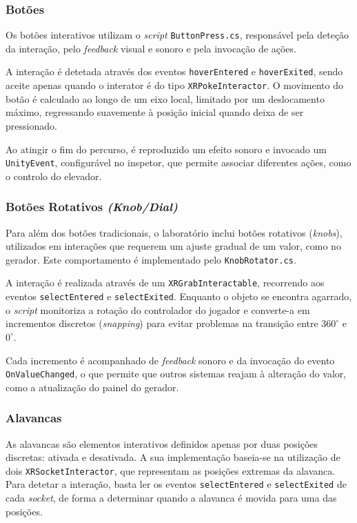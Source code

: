 \documentclass[a4paper, 12pt]{book}
\begin{document}
\subsubsection{Botões}\label{sssec:botoes}

Os botões interativos utilizam o \textit{script} \texttt{ButtonPress.cs}, responsável pela
deteção da interação, pelo \textit{feedback} visual e sonoro e pela invocação de ações.

A interação é detetada através dos eventos \texttt{hoverEntered} e
\texttt{hoverExited}, sendo aceite apenas quando o interator é do tipo
\texttt{XRPokeInteractor}. O movimento do botão é calculado ao longo de um eixo local,
limitado por um deslocamento máximo, regressando suavemente à posição inicial quando
deixa de ser pressionado.

Ao atingir o fim do percurso, é reproduzido um efeito sonoro e invocado um
\texttt{UnityEvent}, configurável no inspetor, que permite associar diferentes ações,
como o controlo do elevador.

\subsubsection{Botões Rotativos \textit{(Knob/Dial)}}

Para além dos botões tradicionais, o laboratório inclui botões rotativos
(\textit{knobs}), utilizados em interações que requerem um ajuste gradual de um valor,
como no gerador. Este comportamento é implementado pelo \texttt{KnobRotator.cs}.

A interação é realizada através de um \texttt{XRGrabInteractable}, recorrendo aos eventos
\texttt{selectEntered} e \texttt{selectExited}. Enquanto o objeto se encontra agarrado,
o \textit{script} monitoriza a rotação do controlador do jogador e converte-a em
incrementos discretos (\textit{snapping}) para evitar problemas na transição entre
$360^{\circ}$ e $0^{\circ}$.

Cada incremento é acompanhado de \textit{feedback} sonoro e da invocação do evento
\texttt{OnValueChanged}, o que permite que outros sistemas reajam à alteração do valor,
como a atualização do painel do gerador.

\subsubsection{Alavancas}
As alavancas são elementos interativos definidos apenas por duas posições discretas: ativada e desativada. A sua implementação baseia-se na 
utilização de dois \texttt{XRSocketInteractor}, que representam as posições extremas da alavanca. Para detetar a interação, 
basta ler os eventos \texttt{selectEntered} e \texttt{selectExited} de cada \textit{socket}, 
de forma a determinar quando a alavanca é movida para uma das posições.
\end{document}
